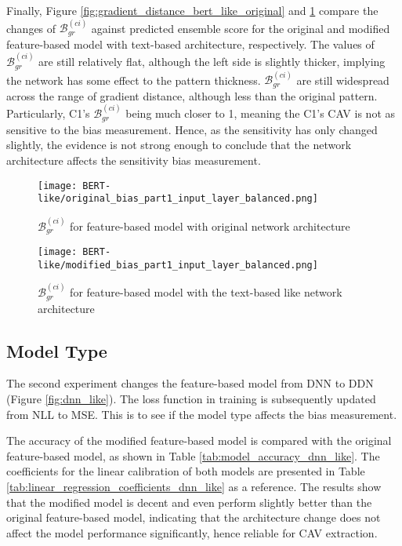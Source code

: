 Finally, Figure \ref{fig:gradient_distance_bert_like_original} and \ref{fig:gradient_distance_bert_like_modified} compare the changes of $\mathcal{B}^{(ci)}_{gr}$ against predicted ensemble score for the original and modified feature-based model with text-based architecture, respectively. The values of $\mathcal{B}^{(ci)}_{gr}$ are still relatively flat, although the left side is slightly thicker, implying the network has some effect to the pattern thickness. $\mathcal{B}^{(ci)}_{gr}$ are still widespread across the range of gradient distance, although less than the original pattern. Particularly, C1's $\mathcal{B}^{(ci)}_{gr}$ being much closer to 1, meaning the C1's CAV is not as sensitive to the bias measurement. Hence, as the sensitivity has only changed slightly, the evidence is not strong enough to conclude that the network architecture affects the sensitivity bias measurement.

\begin{figure}[H]
    \centering
    \begin{minipage}[t]{0.48\textwidth}
        \centering
        \texttt{[image: BERT-like/original\_bias\_part1\_input\_layer\_balanced.png]}
        \caption{$\mathcal{B}^{(ci)}_{gr}$ for feature-based model with original network architecture}
        \label{fig:gradient_distance_bert_like_original}
    \end{minipage}
    \hfill
    \begin{minipage}[t]{0.48\textwidth}
        \centering
        \texttt{[image: BERT-like/modified\_bias\_part1\_input\_layer\_balanced.png]}
        \caption{$\mathcal{B}^{(ci)}_{gr}$ for feature-based model with the text-based like network architecture}
        \label{fig:gradient_distance_bert_like_modified}
    \end{minipage}
\end{figure}

\subsection{Model Type}
The second experiment changes the feature-based model from DNN to DDN (Figure \ref{fig:dnn_like}). The loss function in training is subsequently updated from NLL to MSE. This is to see if the model type affects the bias measurement.

The accuracy of the modified feature-based model is compared with the original feature-based model, as shown in Table \ref{tab:model_accuracy_dnn_like}. The coefficients for the linear calibration of both models are presented in Table \ref{tab:linear_regression_coefficients_dnn_like} as a reference. The results show that the modified model is decent and even perform slightly better than the original feature-based model, indicating that the architecture change does not affect the model performance significantly, hence reliable for CAV extraction.

